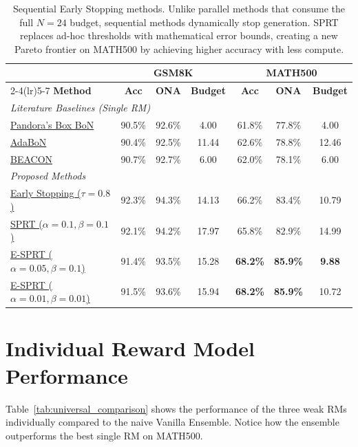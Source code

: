 \documentclass[a4paper,11pt]{article}
\begin{document}
\begin{table}[H]
\centering
\begin{tabular}{l ccc ccc}
\toprule
& \multicolumn{3}{c}{\textbf{GSM8K}} & \multicolumn{3}{c}{\textbf{MATH500}} \\
\cmidrule(lr){2-4}\cmidrule(lr){5-7}
\textbf{Method} & \textbf{Acc} & \textbf{ONA} & \textbf{Budget} & \textbf{Acc} & \textbf{ONA} & \textbf{Budget} \\
\midrule
\multicolumn{7}{l}{\textit{Literature Baselines (Single RM)}} \\
\hyperref[sec:pandora]{Pandora's Box BoN} & 90.5\% & 92.6\% & 4.00 & 61.8\% & 77.8\% & 4.00 \\
\hyperref[sec:adabon]{AdaBoN} & 90.4\% & 92.5\% & 11.44 & 62.6\% & 78.8\% & 12.46 \\
\hyperref[sec:beacon]{BEACON} & 90.7\% & 92.7\% & 6.00 & 62.0\% & 78.1\% & 6.00 \\
\midrule
\multicolumn{7}{l}{\textit{Proposed Methods}} \\
\hyperref[sec:early_stopping]{Early Stopping ($\tau=0.8$)} & 92.3\% & 94.3\% & 14.13 & 66.2\% & 83.4\% & 10.79 \\
\hyperref[sec:math_sprt]{SPRT ($\alpha=0.1, \beta=0.1$)} & 92.1\% & 94.2\% & 17.97 & 65.8\% & 82.9\% & 14.99 \\
\hyperref[sec:math_sprt]{E-SPRT ($\alpha=0.05, \beta=0.1$)} & 91.4\% & 93.5\% & 15.28 & \textbf{68.2\%} & \textbf{85.9\%} & \textbf{9.88} \\
\hyperref[sec:math_sprt]{E-SPRT ($\alpha=0.01, \beta=0.01$)} & 91.5\% & 93.6\% & 15.94 & \textbf{68.2\%} & \textbf{85.9\%} & 10.72 \\
\bottomrule
\end{tabular}
\caption{Sequential Early Stopping methods. Unlike parallel methods that consume the full $N=24$ budget, sequential methods dynamically stop generation. SPRT replaces ad-hoc thresholds with mathematical error bounds, creating a new Pareto frontier on MATH500 by achieving higher accuracy with less compute.}
\label{tab:early_stopping}
\end{table}

\section{Individual Reward Model Performance}
Table~\ref{tab:universal_comparison} shows the performance of the three weak RMs individually compared to the naive Vanilla Ensemble. Notice how the ensemble outperforms the best single RM on MATH500.
\end{document}
